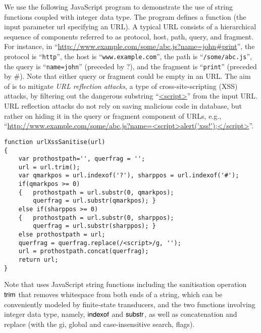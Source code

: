 
\begin{example}\label{exmp:running}
We use the following JavaScript program to demonstrate the use of string functions coupled with integer data type.
The program defines a function {\urlxsssanitise} (the input parameter url specifying an URL). A typical URL consists of a hierarchical sequence of components referred to as protocol, host, path, query, and fragment. For instance, in ``\url{http://www.example.com/some/abc.js?name=john#print}'', the protocol is ``{\tt http}'', the host is ``{\tt www.example.com}'', the path is ``{\tt /some/abc.js}'', the query is ``{\tt name=john}'' (preceded by $?$), and the fragment is ``{\tt print}'' (preceded by $\#$). Note that either query or fragment could be empty in an URL. The aim of {\urlxsssanitise} is to mitigate \emph{URL reflection attacks}, a type of cross-site-scripting (XSS) attacks, by filtering out the dangerous substring ``\url{<script>}'' from the input URL. URL reflection attacks  do not rely on saving malicious code in database, but rather on hiding it in the query or fragment component of URLs, e.g., ``\url{http://www.example.com/some/abc.js?name=<script>alert('xss!');</script>}''.
{\small
\begin{verbatim}
function urlXssSanitise(url)
{
    var prothostpath='', querfrag = '';
    url = url.trim();
    var qmarkpos = url.indexof('?'), sharppos = url.indexof('#');
    if(qmarkpos >= 0) 
    {   prothostpath = url.substr(0, qmarkpos);
        querfrag = url.substr(qmarkpos); }
    else if(sharppos >= 0)
    {   prothostpath = url.substr(0, sharppos);
        querfrag = url.substr(sharppos); }
    else prothostpath = url;
    querfrag = querfrag.replace(/<script>/g, '');
    url = prothostpath.concat(querfrag);
    return url;
}
\end{verbatim}
}
%
Note that {\urlxsssanitise} uses JavaScript string functions including the sanitisation operation $\sf trim$ that removes whitespace from both ends of a string, which can be conveniently modeled by finite-state transducers, and the two functions involving integer data type, namely, $\sf indexof$ and $\sf substr$, as well as concatenation and replace (with the gi, global and case-insensitive search, flags).



\end{example}

